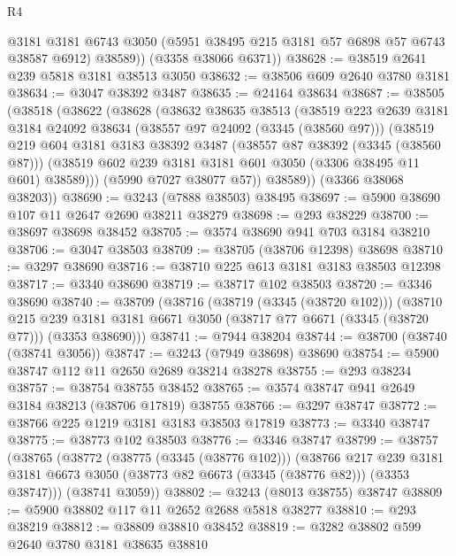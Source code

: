 \begin{lexlean}{R4}
\begin{coremodule}
          @3181
          @3181
          @6743
          @3050
          (@5951 @38495 @215 @3181 @57 @6898 @57 @6743 @38587 @6912)
          @38589))
      (@3358 @38066 @6371))
@38628 := @38519 @2641 @239 @5818 @3181 @38513 @3050
@38632 := @38506 @609 @2640 @3780 @3181
@38634 := @3047 @38392 @3487
@38635 := @24164 @38634
@38687 := @38505
    (@38518
      (@38622
        (@38628
          (@38632
            @38635
            @38513
            (@38519
              @223
              @2639
              @3181
              @3184
              @24092
              @38634
              (@38557 @97 @24092 (@3345 (@38560 @97)))
              (@38519
                @219
                @604
                @3181
                @3183
                @38392
                @3487
                (@38557 @87 @38392 (@3345 (@38560 @87)))
                (@38519 @602 @239 @3181 @3181 @601 @3050 (@3306 @38495 @11 @601) @38589)))
            (@5990 @7027 @38077 @57))
          @38589))
      (@3366 @38068 @38203))
@38690 := @3243 (@7888 @38503) @38495
@38697 := @5900 @38690 @107 @11 @2647 @2690 @38211 @38279
@38698 := @293 @38229
@38700 := @38697 @38698 @38452
@38705 := @3574 @38690 @941 @703 @3184 @38210
@38706 := @3047 @38503
@38709 := @38705 (@38706 @12398) @38698
@38710 := @3297 @38690
@38716 := @38710 @225 @613 @3181 @3183 @38503 @12398
@38717 := @3340 @38690
@38719 := @38717 @102 @38503
@38720 := @3346 @38690
@38740 := @38709
    (@38716
      (@38719 (@3345 (@38720 @102)))
      (@38710
        @215
        @239
        @3181
        @3181
        @6671
        @3050
        (@38717 @77 @6671 (@3345 (@38720 @77)))
        (@3353 @38690)))
@38741 := @7944 @38204
@38744 := @38700 (@38740 (@38741 @3056))
@38747 := @3243 (@7949 @38698) @38690
@38754 := @5900 @38747 @112 @11 @2650 @2689 @38214 @38278
@38755 := @293 @38234
@38757 := @38754 @38755 @38452
@38765 := @3574 @38747 @941 @2649 @3184 @38213 (@38706 @17819) @38755
@38766 := @3297 @38747
@38772 := @38766 @225 @1219 @3181 @3183 @38503 @17819
@38773 := @3340 @38747
@38775 := @38773 @102 @38503
@38776 := @3346 @38747
@38799 := @38757
    (@38765
      (@38772
        (@38775 (@3345 (@38776 @102)))
        (@38766
          @217
          @239
          @3181
          @3181
          @6673
          @3050
          (@38773 @82 @6673 (@3345 (@38776 @82)))
          (@3353 @38747)))
      (@38741 @3059))
@38802 := @3243 (@8013 @38755) @38747
@38809 := @5900 @38802 @117 @11 @2652 @2688 @5818 @38277
@38810 := @293 @38219
@38812 := @38809 @38810 @38452
@38819 := @3282 @38802 @599 @2640 @3780 @3181 @38635 @38810

\end{coremodule}
\end{lexlean}
